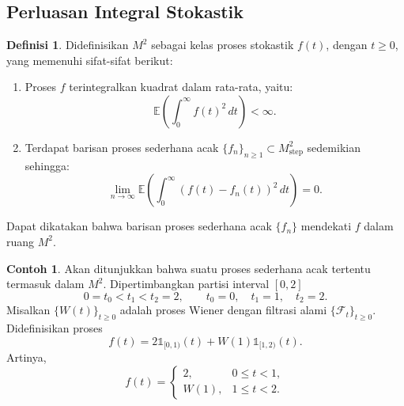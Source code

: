 \documentclass[aspectratio=169,11pt]{beamer}
\theoremstyle{definition}
\newtheorem{definisi}{Definisi}
\newtheorem{contoh}{Contoh}
\begin{document}
\subsection{Perluasan Integral Stokastik}
\begin{frame}{\insertsection}{\insertsubsection}
  \begin{definisi}\label{def:5.3}
    Didefinisikan $M^2$ sebagai kelas proses stokastik $f(t)$, dengan $t \geq 0$, yang memenuhi sifat-sifat berikut:
    \begin{enumerate}
      \item Proses $f$ terintegralkan kuadrat dalam rata-rata, yaitu:
            \begin{equation*}
              \mathbb{E}\left(\int_0^\infty f(t)^2 \, dt\right) < \infty.
            \end{equation*}
      \item Terdapat barisan proses sederhana acak $\{f_n\}_{n \geq 1} \subset M_{\text{step}}^2$ sedemikian sehingga:
            \begin{equation*}
              \lim_{n \to \infty} \mathbb{E}\left(\int_0^\infty (f(t) - f_n(t))^2 \, dt\right) = 0.
            \end{equation*}
    \end{enumerate}
    Dapat dikatakan bahwa barisan proses sederhana acak $\{f_n\}$ mendekati $f$ dalam ruang $M^2$.
  \end{definisi}
\end{frame}

\begin{frame}{\insertsection}{\insertsubsection}
  \begin{contoh}\label{cth:5.5}
    Akan ditunjukkan bahwa suatu proses sederhana acak tertentu termasuk dalam
    $M^2$. Dipertimbangkan partisi interval $[0,2]$
    \[
      0=t_0<t_1<t_2=2,
      \qquad
      t_0=0,\quad t_1=1,\quad t_2=2.
    \]
    Misalkan $\{W(t)\}_{t\geq 0}$ adalah proses Wiener dengan filtrasi alami
    $\{\mathcal{F}_t\}_{t\geq 0}$. Didefinisikan proses
    \[
      f(t)
      =
      2\mathds{1}_{[0,1)}(t)
      +
      W(1)\mathds{1}_{[1,2)}(t).
    \]
    Artinya,
    \[
      f(t)=
      \begin{cases}
        2,    & 0\leq t<1, \\
        W(1), & 1\leq t<2.
      \end{cases}
    \]
  \end{contoh}
\end{frame}
\end{document}
